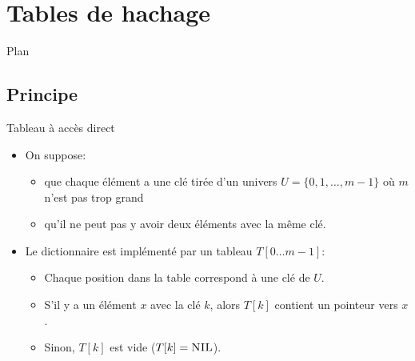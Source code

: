 \section{Tables de hachage}

\begin{frame}{Plan}

\tableofcontents[currentsection]

\end{frame}

\subsection{Principe}

\begin{frame}{Tableau à accès direct}

\begin{itemize}
\item On suppose:
\begin{itemize}
\item que chaque élément a une clé tirée d'un univers
  $U=\{0,1,\ldots,m-1\}$ où $m$ n'est pas trop grand
\item qu'il ne peut pas y avoir deux éléments avec la même clé.
\end{itemize}
\item Le dictionnaire est implémenté par un tableau $T[0\ldots m-1]$:
\begin{itemize}
\item Chaque position dans la table correspond à une clé de $U$.
\item S'il y a un élément $x$ avec la clé $k$, alors $T[k]$ contient un pointeur vers $x$.
\item Sinon, $T[k]$ est vide ($T[k]=\textnormal{\scshape NIL}$).
\end{itemize}
\end{itemize}

\end{frame}

